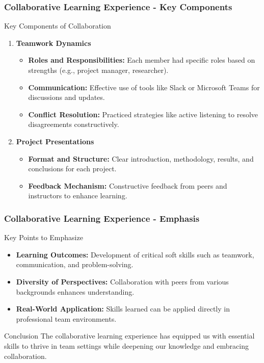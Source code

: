 \documentclass[aspectratio=169]{beamer}
\begin{document}
\begin{frame}[fragile]
    \frametitle{Collaborative Learning Experience - Key Components}
    \begin{block}{Key Components of Collaboration}
        \begin{enumerate}
            \item \textbf{Teamwork Dynamics}
            \begin{itemize}
                \item \textbf{Roles and Responsibilities:} Each member had specific roles based on strengths (e.g., project manager, researcher).
                \item \textbf{Communication:} Effective use of tools like Slack or Microsoft Teams for discussions and updates.
                \item \textbf{Conflict Resolution:} Practiced strategies like active listening to resolve disagreements constructively.
            \end{itemize}
            \item \textbf{Project Presentations}
            \begin{itemize}
                \item \textbf{Format and Structure:} Clear introduction, methodology, results, and conclusions for each project.
                \item \textbf{Feedback Mechanism:} Constructive feedback from peers and instructors to enhance learning.
            \end{itemize}
        \end{enumerate}
    \end{block}
\end{frame}

\begin{frame}[fragile]
    \frametitle{Collaborative Learning Experience - Emphasis}
    \begin{block}{Key Points to Emphasize}
        \begin{itemize}
            \item \textbf{Learning Outcomes:} Development of critical soft skills such as teamwork, communication, and problem-solving.
            \item \textbf{Diversity of Perspectives:} Collaboration with peers from various backgrounds enhances understanding.
            \item \textbf{Real-World Application:} Skills learned can be applied directly in professional team environments.
        \end{itemize}
    \end{block}

    \begin{block}{Conclusion}
        The collaborative learning experience has equipped us with essential skills to thrive in team settings while deepening our knowledge and embracing collaboration.
    \end{block}
\end{frame}
\end{document}
